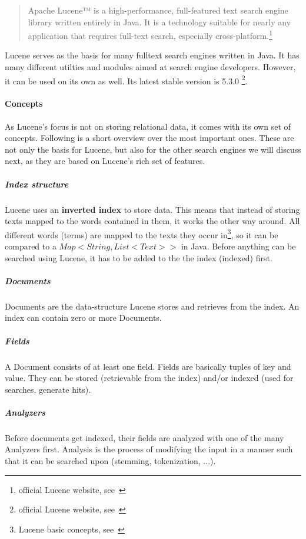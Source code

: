 \begin{quote}
	Apache Lucene™ is a high-performance, full-featured text search engine library written entirely in Java. It is a technology suitable for nearly any application that requires full-text search, especially cross-platform.\footnote{official Lucene website, see~\cite{lucene_apache_org}}
\end{quote}
Lucene serves as the basis for many fulltext search engines written in Java. It has many different utilties and modules aimed at search engine developers. However, it can be used on its own as well. Its latest stable version is 5.3.0 \footnote{official Lucene website, see~\cite{lucene_apache_org}}.

\paragraph{Concepts}

As Lucene's focus is not on storing relational data, it comes with its own set of concepts. Following is a short overview over the most important ones. These are not only the basis for Lucene, but also for the other search engines we will discuss next, as they are based on Lucene's rich set of features.

\subparagraph{Index structure}
Lucene uses an \textbf{inverted index} to store data. This means that instead of storing texts mapped to the words contained in them, it works the other way around. All different words (terms) are mapped to the texts they occur in\footnote{Lucene basic concepts, see~\cite{lucene_basic_concepts}}, so it can be compared to a \(Map<String, List<Text>>\) in Java. Before anything can be searched using Lucene, it has to be added to the the index (indexed) first.

\subparagraph{Documents}
Documents are the data-structure Lucene stores and retrieves from the index. An index can contain zero or more Documents.

\subparagraph{Fields}
A Document consists of at least one field. Fields are basically tuples of key and value. They can be stored (retrievable from the index) and/or indexed (used for searches, generate hits).

\subparagraph{Analyzers}
Before documents get indexed, their fields are analyzed with one of the many Analyzers first. Analysis is the process of modifying the input in a manner such that it can be searched upon (stemming, tokenization, ...).

\pagebreak

